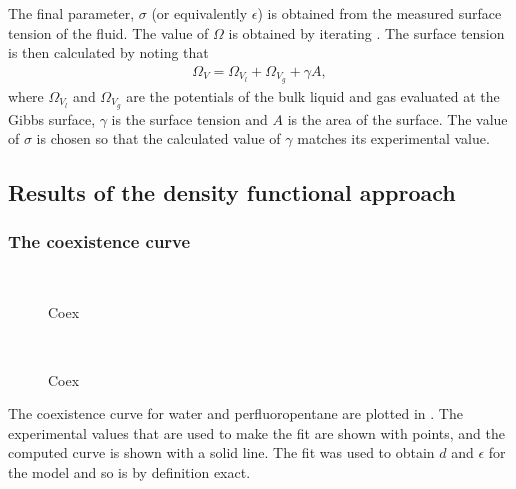 The final parameter, $\sigma$ (or equivalently $\epsilon$) is obtained from the measured surface tension of the fluid.
The value of $\Omega$ is obtained by iterating .  
The surface tension is then calculated by noting that
\begin{align}
  \Omega_V = \Omega_{V_l} + \Omega_{V_g} + \gamma A,
\end{align}
where $\Omega_{V_l}$ and $\Omega_{V_g}$ are the potentials of the bulk liquid and gas evaluated at the Gibbs surface,
$\gamma$ is the surface tension and $A$ is the area of the surface.
The value of $\sigma$ is chosen so that the calculated value of $\gamma$ matches its experimental value.

\subsection{Results of the density functional approach}\label{sec:nuc:DFT:results}

\subsubsection{The coexistence curve}

\begin{figure}
 \centering
  \\
  \caption{
    Coex
  }
 \label{fig:nuc:coex}
\end{figure}

\begin{figure}
 \centering
  \subfloat[d water]{}
  \subfloat[e water]{}\\
  \subfloat[d pfp]{}
  \subfloat[e pfp]{}
  \caption{
    Coex
  }
 \label{fig:nuc:coex}
\end{figure}


The coexistence curve for water and perfluoropentane are plotted in .
The experimental values that are used to make the fit are shown with points,
and the computed curve is shown with a solid line.  
The fit was used to obtain $d$ and $\epsilon$ for the model and so is by definition exact.


